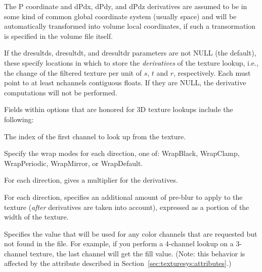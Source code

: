 The {\cf P} coordinate and {\cf dPdx}, {\cf dPdy}, and {\cf dPdz}
derivatives are assumed to be in some kind of common global coordinate
system (usually  space) and will be automatically transformed
into volume local coordinates, if such a transormation is specified in
the volume file itself.

If the {\cf dresultds}, {\cf dresultdt}, and  {\cf dresultdr} parameters are
not {\cf NULL} (the default), these specify locations in which to store the
\emph{derivatives} of the texture lookup, i.e., the change of the filtered
texture per unit of $s$, $t$ and $r$, respectively.  Each must point to at least
{\cf nchannels} contiguous floats.  If they are {\cf NULL}, the derivative
computations will not be performed.

Fields within {\cf options} that are honored for 3D texture lookups
include the following:

\vspace{-12pt}
\vspace{10pt}
The index of the first channel to look up from the texture.
\apiend

\vspace{-24pt}
\vspace{10pt}
Specify the wrap modes for each direction, one of: 
{\cf WrapBlack}, {\cf WrapClamp}, {\cf WrapPeriodic}, {\cf WrapMirror},
or {\cf WrapDefault}.
\apiend

\vspace{-24pt}
\vspace{10pt}
For each direction, gives a multiplier for the derivatives.
\apiend

\vspace{-24pt}
\vspace{10pt}
For each direction, specifies an additional amount of pre-blur to apply
to the texture (\emph{after} derivatives are taken into account),
expressed as a portion of the width of the texture.
\apiend

\vspace{-24pt}
\vspace{10pt}
Specifies the value that will be used for any color channels that are
requested but not found in the file.  For example, if you perform a
4-channel lookup on a 3-channel texture, the last channel will
get the fill value.  (Note: this behavior is affected by the
 attribute described in 
Section~\ref{sec:texturesys:attributes}.)
\apiend


